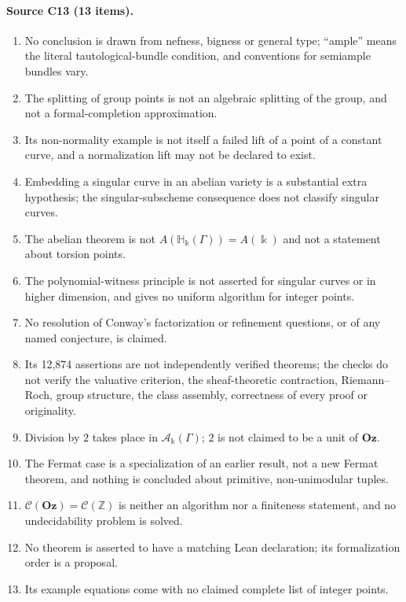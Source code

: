 \documentclass[11pt,oneside]{article}
\numberwithin{equation}{section}
\theoremstyle{definition}
\theoremstyle{remark}
\newcommand{\Oz}{\mathbf{Oz}}
\newcommand{\Z}{\mathbb Z}
\newcommand{\crH}{\mathbb H_\Bbbk(\Gamma)}
\newcommand{\crA}{\mathcal A_\Bbbk(\Gamma)}
\begin{document}
\paragraph{Source C13 (13 items).}
\begin{enumerate}[leftmargin=*,itemsep=1pt]
\item No conclusion is drawn from nefness, bigness or general type; ``ample'' means the
literal tautological-bundle condition, and conventions for semiample bundles vary.
\item The splitting of group points is not an algebraic splitting of the group, and not a
formal-completion approximation.
\item Its non-normality example is not itself a failed lift of a point of a constant
curve, and a normalization lift may not be declared to exist.
\item Embedding a singular curve in an abelian variety is a substantial extra hypothesis;
the singular-subscheme consequence does not classify singular curves.
\item The abelian theorem is not $A(\crH)=A(\Bbbk)$ and not a statement about torsion points.
\item The polynomial-witness principle is not asserted for singular curves or in higher
dimension, and gives no uniform algorithm for integer points.
\item No resolution of Conway's factorization or refinement questions, or of any named
conjecture, is claimed.
\item Its 12,874 assertions are not independently verified theorems; the checks do not
verify the valuative criterion, the sheaf-theoretic contraction, Riemann--Roch, group
structure, the class assembly, correctness of every proof or originality.
\item Division by $2$ takes place in $\crA$; $2$ is not claimed to be a unit of $\Oz$.
\item The Fermat case is a specialization of an earlier result, not a new Fermat
theorem, and nothing is concluded about primitive, non-unimodular tuples.
\item $\mathcal C(\Oz)=\mathcal C(\Z)$ is neither an algorithm nor a finiteness statement,
and no undecidability problem is solved.
\item No theorem is asserted to have a matching Lean declaration; its formalization order
is a proposal.
\item Its example equations come with no claimed complete list of integer points.
\end{enumerate}
\end{document}
